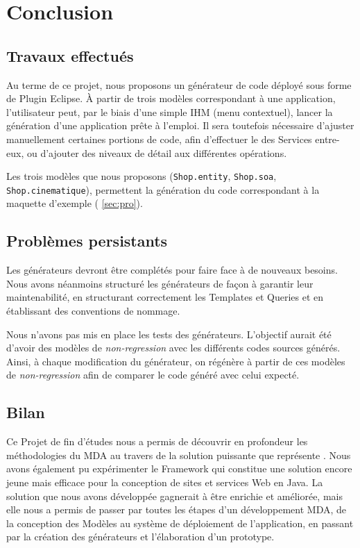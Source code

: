 \chapter{Conclusion}\label{chap:COnc}


\section{Travaux effectués}

Au terme de ce projet, nous proposons un générateur de code déployé sous forme de Plugin Eclipse. À partir de trois modèles correspondant à une application, l'utilisateur peut, par le biais d'une simple IHM (menu contextuel), lancer la génération d'une application \kwplay prête à l'emploi. Il sera toutefois nécessaire d'ajuster manuellement certaines portions de code, afin d'effectuer le  des Services entre-eux, ou d'ajouter des niveaux de détail aux différentes opérations.

Les trois modèles que nous proposons (\verb+Shop.entity+, \verb+Shop.soa+, \verb+Shop.cinematique+), permettent la génération du code correspondant à la maquette d'exemple (\cf{} \ref{sec:pro}).

\section{Problèmes persistants}

Les générateurs devront être complétés pour faire face à de nouveaux besoins. Nous avons néanmoins structuré les générateurs de façon à garantir leur maintenabilité, en structurant correctement les Templates et Queries et en établissant des conventions de nommage.


Nous n'avons pas mis en place les tests des générateurs. L'objectif aurait été d'avoir des modèles de \emph{non-regression} avec les différents codes sources générés. Ainsi, à chaque modification du générateur, on régénère à partir de ces modèles de \emph{non-regression} afin de comparer le code généré avec celui expecté.

\section{Bilan}

Ce Projet de fin d'études nous a permis de découvrir en profondeur les méthodologies du MDA au travers de la solution puissante que représente \kwacceleo. Nous avons également pu expérimenter le Framework \kwplay qui constitue une solution encore jeune mais efficace pour la conception de sites et services Web en Java. La solution que nous avons développée gagnerait à être enrichie et améliorée, mais elle nous a permis de passer par toutes les étapes d'un développement MDA, de la conception des Modèles au système de déploiement de l'application, en passant par la création des générateurs et l'élaboration d'un prototype.

